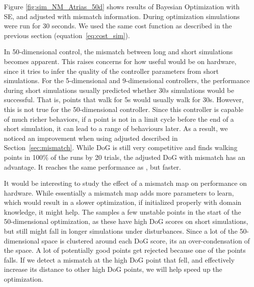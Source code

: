 Figure \ref{fig:sim_NM_Atrias_50d} shows results of Bayesian Optimization with SE, \dogkernel and adjusted \dogkernel with mismatch information. During optimization simulations were run for $30$ seconds. We used the same cost function as described in the previous section (equation~\ref{eq:cost_sim}).

In 50-dimensional control, the mismatch between long and short simulations becomes apparent. This raises concerns for how useful \dogkernel would be on hardware, since it tries to infer the quality of the controller parameters from short simulations. 
For the 5-dimensional and 9-dimensional controllers, the performance during short simulations usually predicted whether $30s$ simulations would be successful. That is, points that walk for 5s would usually walk for 30s. However, this is not true for the 50-dimensional controller. Since this controller is capable of much richer behaviors, if a point is not in a limit cycle before the end of a short simulation, it can lead to a range of behaviours later. As a result, we noticed an improvement when using adjusted \dogkernel described in Section~\ref{sec:mismatch}. While DoG is still very competitive and finds walking points in 100\% of the runs by 20 trials, the adjusted DoG with mismatch has an advantage. It reaches the same performance as \dogkernel, but faster. 


It would be interesting to study the effect of a mismatch map on performance on hardware. While essentially a mismatch map adds more parameters to learn, which would result in a slower optimization, if initialized properly with domain knowledge, it might help. The \dogkernel samples a few unstable points in the start of the 50-dimensional optimization, as these have high DoG scores on short simulations, but still might fall in longer simulations under disturbances. Since a lot of the 50-dimensional space is clustered around each DoG score, its an over-condensation of the space. A lot of potentially good points get rejected because one of the points falls. If we detect a mismatch at the high DoG point that fell, and effectively increase its distance to other high DoG points, we will help speed up the optimization.

